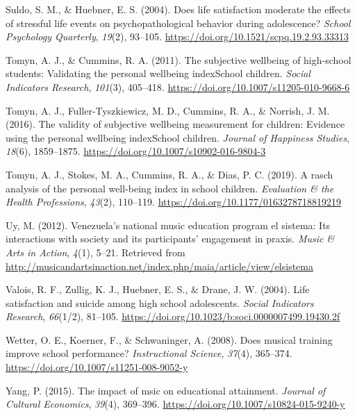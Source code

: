 \documentclass[a4, 12pt]{article}
\begin{document}
\leavevmode\hypertarget{ref-Suldo2004}{}%
Suldo, S. M., \& Huebner, E. S. (2004). Does life satisfaction moderate the effects of stressful life events on psychopathological behavior during adolescence? \emph{School Psychology Quarterly}, \emph{19}(2), 93--105. \url{https://doi.org/10.1521/scpq.19.2.93.33313}

\leavevmode\hypertarget{ref-Tomyn2011a}{}%
Tomyn, A. J., \& Cummins, R. A. (2011). The subjective wellbeing of high-school students: Validating the personal wellbeing indexSchool children. \emph{Social Indicators Research}, \emph{101}(3), 405--418. \url{https://doi.org/10.1007/s11205-010-9668-6}

\leavevmode\hypertarget{ref-Tomyn2016}{}%
Tomyn, A. J., Fuller-Tyszkiewicz, M. D., Cummins, R. A., \& Norrish, J. M. (2016). The validity of subjective wellbeing measurement for children: Evidence using the personal wellbeing indexSchool children. \emph{Journal of Happiness Studies}, \emph{18}(6), 1859--1875. \url{https://doi.org/10.1007/s10902-016-9804-3}

\leavevmode\hypertarget{ref-Tomyn2019}{}%
Tomyn, A. J., Stokes, M. A., Cummins, R. A., \& Dias, P. C. (2019). A rasch analysis of the personal well-being index in school children. \emph{Evaluation \& the Health Professions}, \emph{43}(2), 110--119. \url{https://doi.org/10.1177/0163278718819219}

\leavevmode\hypertarget{ref-Uy2012}{}%
Uy, M. (2012). Venezuela's national music education program el sistema: Its interactions with society and its participants' engagement in praxis. \emph{Music \& Arts in Action}, \emph{4}(1), 5--21. Retrieved from \url{http://musicandartsinaction.net/index.php/maia/article/view/elsistema}

\leavevmode\hypertarget{ref-Valois2004}{}%
Valois, R. F., Zullig, K. J., Huebner, E. S., \& Drane, J. W. (2004). Life satisfaction and suicide among high school adolescents. \emph{Social Indicators Research}, \emph{66}(1/2), 81--105. \url{https://doi.org/10.1023/b:soci.0000007499.19430.2f}

\leavevmode\hypertarget{ref-Wetter2008}{}%
Wetter, O. E., Koerner, F., \& Schwaninger, A. (2008). Does musical training improve school performance? \emph{Instructional Science}, \emph{37}(4), 365--374. \url{https://doi.org/10.1007/s11251-008-9052-y}

\leavevmode\hypertarget{ref-Yang2015}{}%
Yang, P. (2015). The impact of msic on educational attainment. \emph{Journal of Cultural Economics}, \emph{39}(4), 369--396. \url{https://doi.org/10.1007/s10824-015-9240-y}
\end{document}
